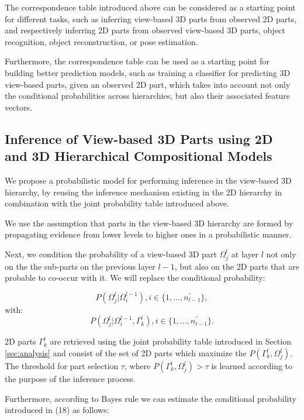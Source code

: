 \documentclass[runningheads]{llncs}
\begin{document}
The correspondence table introduced above can be considered as a starting point for different tasks, such as inferring view-based 3D parts from observed 2D parts, and respectively inferring 2D parts from observed view-based 3D parts, object recognition, object reconstruction, or pose estimation. 

Furthermore, the correspondence table can be used as a starting point for building better prediction models, such as training a classifier for predicting 3D view-based parts, given an observed 2D part, which takes into account not only the conditional probabilities across hierarchies, but also their associated feature vectors.

\subsection{Inference of View-based 3D Parts using 2D and 3D Hierarchical Compositional Models}

We propose a probabilistic model for performing inference in the view-based 3D hierarchy, by reusing the inference mechanism existing in the 2D hierarchy in combination with the joint probability table introduced above.

We use the assumption that parts in the view-based 3D hierarchy are formed by propagating evidence from lower levels to higher ones in a probabilistic manner. 

Next, we condition the probability of a view-based 3D part $\Omega_j^{l}$ at layer $l$ not only on the the sub-parts on the previous layer $l-1$, but also on the 2D parts that are probable to co-occur with it. We will replace the conditional probability:

\begin{equation}
 P(\Omega_j^{l} \vert \Omega_i^{l-1}), i \in \{1,\dots,n_{l-1}^{'}\},
\end{equation}
with:
\begin{equation}
 P(\Omega_j^{l} \vert \Omega_i^{l-1},\Gamma_k^l), i \in \{1,\dots,n_{l-1}^{'}\}.
\end{equation}

2D parts $\Gamma_k^l$ are retrieved using the joint probability table introduced in Section \ref{sec:analysis} and consist of the set of 2D parts which maximize the $P(\Gamma_k^l,\Omega_j^l)$. The threshold for part selection $\tau$, where $P(\Gamma_k^l,\Omega_j^l)>\tau$ is learned according to the purpose of the inference process.

Furthermore, according to Bayes rule we can estimate the conditional probability introduced in (18) as follows:
\end{document}
